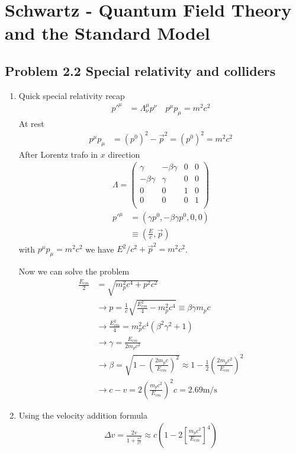 \documentclass[10pt,a4paper]{book}
\theoremstyle{definition}
\begin{document}
\section{{\sc Schwartz} - Quantum Field Theory and the Standard Model}
\subsection{Problem 2.2 Special relativity and colliders}
\begin{enumerate}
    \item Quick special relativity recap
    \begin{align}
        p'^\mu&=\Lambda^\mu_\nu p^\nu\quad p^\mu p_\mu=m^2c^2
    \end{align}
    At rest
    \begin{align}
        p^\mu p_\mu&=(p^0)^2-\vec{p}^2=(p^0)^2=m^2c^2
    \end{align}
    After Lorentz trafo in $x$ direction
    \begin{align}
        \Lambda=\begin{pmatrix}
        \gamma & -\beta\gamma & 0 & 0\\
        -\beta\gamma & \gamma & 0 & 0\\
        0 & 0 & 1 & 0\\
        0 & 0 & 0 & 1\\
        \end{pmatrix}
    \end{align}
    \begin{align}
        p'^\mu&=(\gamma p^0,-\beta\gamma p^0,0,0)\\
        &\equiv\left(\frac{E}{c},\vec{p}\right)
    \end{align}
    with $p^\mu p_\mu=m^2c^2$ we have $E^2/c^2+\vec{p}^2=m^2c^2$.
    
    Now we can solve the problem
    \begin{align}
        \frac{E_{cm}}{2}&=\sqrt{m_p^2c^4+p^2c^2}\\
        &\rightarrow p = \frac{1}{c}\sqrt{\frac{E_{cm}^2}{4}-m_p^2c^4}\equiv\beta\gamma m_pc\\
        &\rightarrow \frac{E_{cm}^2}{4}=m_p^2c^4(\beta^2\gamma^2+1)\\
        &\rightarrow \gamma=\frac{E_{cm}}{2m_pc^2}\\
        &\rightarrow\beta=\sqrt{1-\left(\frac{2m_pc}{E_{cm}}\right)^2}\approx1-\frac{1}{2}\left(\frac{2m_pc^2}{E_{cm}}\right)^2\\
        &\rightarrow c-v=2\left(\frac{m_pc^2}{E_{cm}}\right)^2c=2.69\text{m/s}
    \end{align}
    \item Using the velocity addition formula
    \begin{align}
        \Delta v=\frac{2v}{1+\frac{v^2}{c^2}}\approx c\left(1-2\left[\frac{m_pc^2}{E_{cm}}\right]^4\right)
    \end{align}
\end{enumerate}
\end{document}
